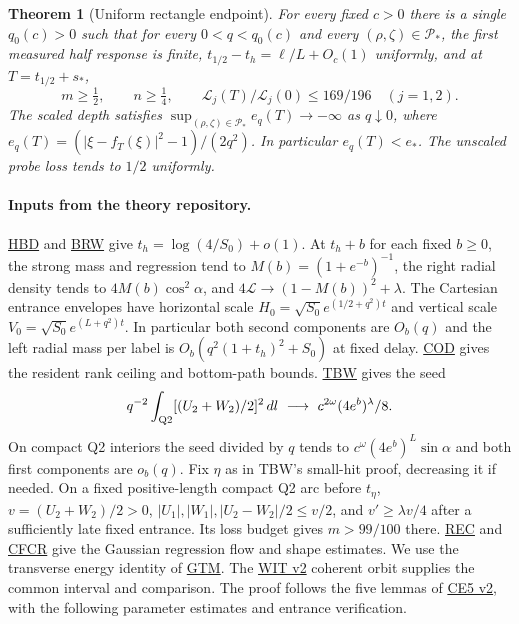 \documentclass[11pt]{article}
\newtheorem{theorem}{Theorem}
\newcommand{\dd}{\,dl}
\newcommand{\Ll}{\mathcal L}
\newcommand{\repo}{https://github.com/TodManlaibaatar/OOD-reversals-theory/blob/737835735fa06a005eec743a9ec2493e247fe8bc}
\newcommand{\src}[2]{\href{\repo/09_canonical_regime_AN04/AN04_#1_v1.tex}{#2}}
\begin{document}
\begin{theorem}[Uniform rectangle endpoint]\label{an04e5rv1:main}
For every fixed $c>0$ there is a single $q_0(c)>0$ such that for every $0<q<q_0(c)$ and every $(\rho,\zeta)\in\mathcal P_*$, the first measured half response is finite, $t_{1/2}-t_h=\ell/L+O_c(1)$ uniformly, and at $T=t_{1/2}+s_*$,
\[
 m\ge\tfrac12,\qquad n\ge\tfrac14,\qquad
 \Ll_j(T)/\Ll_j(0)\le169/196\quad(j=1,2).
\]
The scaled depth satisfies
$\sup_{(\rho,\zeta)\in\mathcal P_*}e_q(T)\to-\infty$ as $q\downarrow0$, where $e_q(T)=(|\xi-f_T(\xi)|^2-1)/(2q^2)$.
In particular $e_q(T)<e_*$. The unscaled probe loss tends to $1/2$ uniformly.
\end{theorem}
\paragraph{Inputs from the theory repository.}
\src{trained_half_mass_bridge_donors}{HBD} and \src{bridge_return_before_weak_learning}{BRW}
give $t_h=\log(4/S_0)+o(1)$. At $t_h+b$ for each fixed $b\ge0$, the strong mass and regression tend to $M(b)=(1+e^{-b})^{-1}$, the right radial density tends to $4M(b)\cos^2\alpha$, and $4\Ll\to (1-M(b))^2+\lambda$. The Cartesian entrance envelopes have horizontal scale $H_0=\sqrt{S_0}e^{(1/2+q^2)t}$ and vertical scale $V_0=\sqrt{S_0}e^{(L+q^2)t}$. In particular both second components are $O_b(q)$ and the left radial mass per label is $O_b(q^2(1+t_h)^2+S_0)$ at fixed delay.
\src{core_output_descent}{COD} gives the resident rank ceiling and bottom-path bounds.
\src{transverse_balance_and_weak_clock}{TBW} gives the seed
\[
 q^{-2}\int_{\rm Q2}[(U_2+W_2)/2]^2\dd\ \longrightarrow\ c^{2\omega}(4e^b)^\lambda/8 .
\]
On compact Q2 interiors the seed divided by $q$ tends to $c^\omega(4e^b)^L\sin\alpha$ and both first components are $o_b(q)$. Fix $\eta$ as in TBW's small-hit proof, decreasing it if needed. On a fixed positive-length compact Q2 arc before $t_\eta$, $v=(U_2+W_2)/2>0$, $|U_1|,|W_1|,|U_2-W_2|/2\le v/2$, and $v'\ge\lambda v/4$ after a sufficiently late fixed entrance. Its loss budget gives $m>99/100$ there.
\src{residual_exchange_channels}{REC} and \src{cap_free_cross_response}{CFCR} give the Gaussian regression flow and shape estimates. We use the transverse energy identity of \src{gate_transport_and_transverse_memory}{GTM}. The \href{\repo/04_witnesses_persistence/AN06_learned_orbit_witnesses_v2.tex}{WIT v2} coherent orbit supplies the common interval and comparison. The proof follows the five lemmas of \href{\repo/09_canonical_regime_AN04/AN04_initialized_central_E5_v2.tex}{CE5 v2}, with the following parameter estimates and entrance verification.
\end{document}
